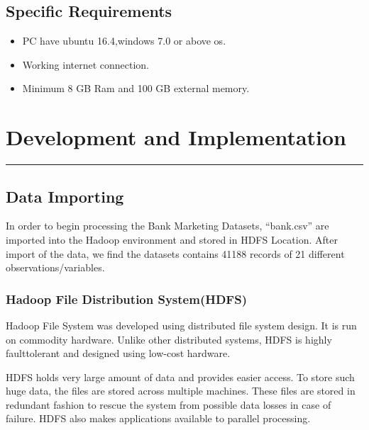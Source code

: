 \section{Specific Requirements}
\begin{itemize}
	\item PC have ubuntu 16.4,windows 7.0 or above os.
	\item Working internet connection.
	\item Minimum 8 GB Ram and 100 GB external memory.
\end{itemize}
\chapter{Development and Implementation}\hrule
\label{Chapter:4}
\section{Data Importing}

In order to begin processing the Bank Marketing Datasets, “bank.csv”  are imported into the Hadoop environment and stored in HDFS Location. After import of the data, we find the datasets contains 41188 records of 21 different observations/variables.
\subsection{Hadoop File Distribution System(HDFS) }
Hadoop File System was developed using distributed file system design. It is run on commodity hardware. Unlike other distributed systems, HDFS is highly faulttolerant and designed using low-cost hardware.

HDFS holds very large amount of data and provides easier access. To store such huge data, the files are stored across multiple machines. These files are stored in redundant fashion to rescue the system from possible data losses in case of failure. HDFS also makes applications available to parallel processing.
